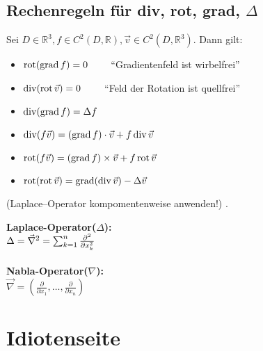 \subsection{Rechenregeln für div, rot, grad, $\Delta$}
\begin{minipage}{9cm}
Sei $D \in \mathbb{R}^3, f \in C^2(D,\mathbb{R}), \vec{v} \in C^2(D,\mathbb{R}^3)$. Dann gilt:
\begin{itemize}
	\item $\operatorname{rot}(\operatorname{grad} f) = 0 \qquad $ ``Gradientenfeld ist wirbelfrei''
	\item $\operatorname{div}(\operatorname{rot} \vec{v}) = 0 \qquad $ ``Feld der Rotation ist quellfrei''
	\item $\operatorname{div}(\operatorname{grad} f) = \Delta f$
	\item $\operatorname{div}(f\vec{v}) = (\operatorname{grad} f) \cdot \vec{v} + f \operatorname{div} \vec{v}$
	\item $\operatorname{rot}(f\vec{v}) = (\operatorname{grad} f) \times \vec{v} + f \operatorname{rot} \vec{v}$
	\item $\operatorname{rot}(\operatorname{rot} \vec{v}) = \operatorname{grad}(\operatorname{div} \vec{v}) - \Delta \vec{v}$
\end{itemize}
(Laplace–Operator kompomentenweise anwenden!) .
\end{minipage}
\hspace{1cm}
\begin{minipage}[b]{6cm}
\textbf{Laplace-Operator($\Delta$):}\\
$\Delta=\vec\nabla^2= \sum_{k=1}^n {\partial^2\over \partial x_k^2}$\\\\
\textbf{ Nabla-Operator($\nabla$):}\\
$\vec\nabla = \left (\frac\partial{\partial x_1},\ldots, \frac\partial{\partial
x_n}\right) $
\end{minipage}

\newpage
\section{Idiotenseite}



\begin{multicols}{2}
  
  \columnbreak
  
  
\end{multicols}
\begin{multicols}{2}
  
  \columnbreak
  
  
\end{multicols}




%


